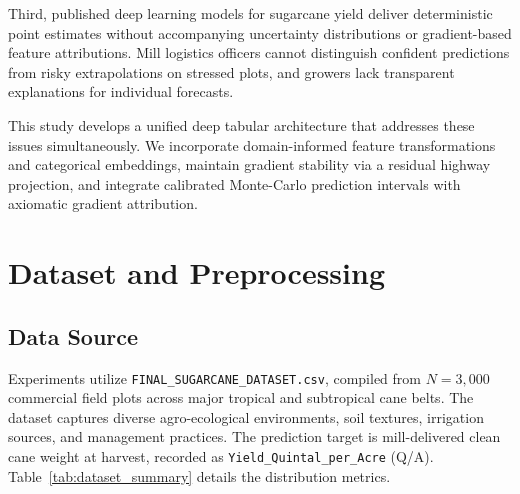 \documentclass[conference,10pt,letterpaper]{IEEEtran}
\begin{document}
Third, published deep learning models for sugarcane yield deliver deterministic point estimates without accompanying uncertainty distributions or gradient-based feature attributions. Mill logistics officers cannot distinguish confident predictions from risky extrapolations on stressed plots, and growers lack transparent explanations for individual forecasts.

This study develops a unified deep tabular architecture that addresses these issues simultaneously. We incorporate domain-informed feature transformations and categorical embeddings, maintain gradient stability via a residual highway projection, and integrate calibrated Monte-Carlo prediction intervals with axiomatic gradient attribution.

\section{Dataset and Preprocessing}

\subsection{Data Source}
Experiments utilize \texttt{FINAL\_SUGARCANE\_DATASET.csv}, compiled from $N = 3{,}000$ commercial field plots across major tropical and subtropical cane belts. The dataset captures diverse agro-ecological environments, soil textures, irrigation sources, and management practices. The prediction target is mill-delivered clean cane weight at harvest, recorded as \texttt{Yield\_Quintal\_per\_Acre} (Q/A). Table~\ref{tab:dataset_summary} details the distribution metrics.
\end{document}
